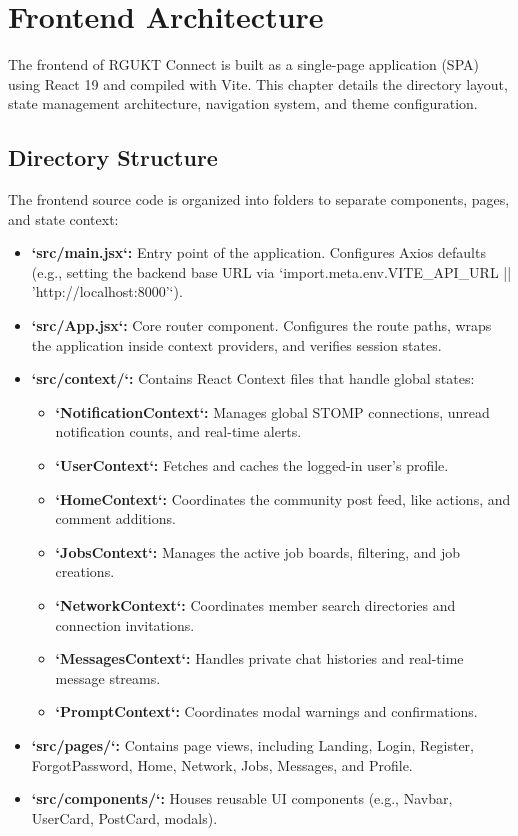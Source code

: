 \chapter{Frontend Architecture}
\label{ch:frontend}

The frontend of RGUKT Connect is built as a single-page application (SPA) using React 19 and compiled with Vite. This chapter details the directory layout, state management architecture, navigation system, and theme configuration.

\section{Directory Structure}
The frontend source code is organized into folders to separate components, pages, and state context:
\begin{itemize}
    \item \textbf{`src/main.jsx`:} Entry point of the application. Configures Axios defaults (e.g., setting the backend base URL via `import.meta.env.VITE\_API\_URL || 'http://localhost:8000'`).
    \item \textbf{`src/App.jsx`:} Core router component. Configures the route paths, wraps the application inside context providers, and verifies session states.
    \item \textbf{`src/context/`:} Contains React Context files that handle global states:
    \begin{itemize}
        \item \textbf{`NotificationContext`:} Manages global STOMP connections, unread notification counts, and real-time alerts.
        \item \textbf{`UserContext`:} Fetches and caches the logged-in user's profile.
        \item \textbf{`HomeContext`:} Coordinates the community post feed, like actions, and comment additions.
        \item \textbf{`JobsContext`:} Manages the active job boards, filtering, and job creations.
        \item \textbf{`NetworkContext`:} Coordinates member search directories and connection invitations.
        \item \textbf{`MessagesContext`:} Handles private chat histories and real-time message streams.
        \item \textbf{`PromptContext`:} Coordinates modal warnings and confirmations.
    \end{itemize}
    \item \textbf{`src/pages/`:} Contains page views, including Landing, Login, Register, ForgotPassword, Home, Network, Jobs, Messages, and Profile.
    \item \textbf{`src/components/`:} Houses reusable UI components (e.g., Navbar, UserCard, PostCard, modals).
\end{itemize}

